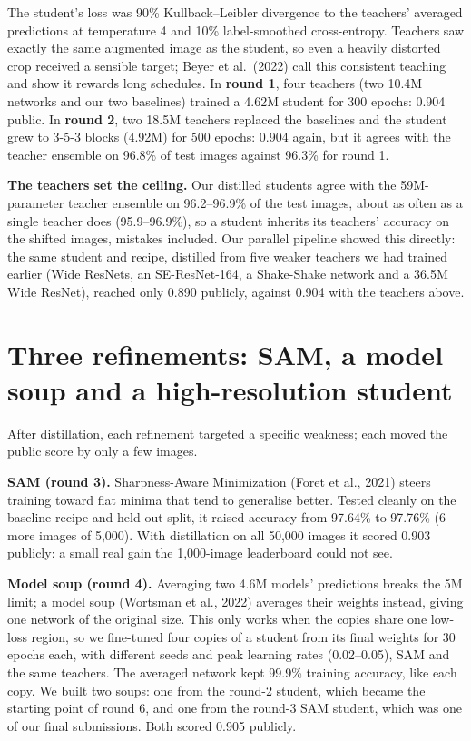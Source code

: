 \documentclass[11pt]{article}
\begin{document}
The student's loss was 90\% Kullback--Leibler divergence to the teachers' averaged predictions at temperature 4 and 10\% label-smoothed cross-entropy. Teachers saw exactly the same augmented image as the student, so even a heavily distorted crop received a sensible target; Beyer et al.\ (2022) call this consistent teaching and show it rewards long schedules. In \textbf{round 1}, four teachers (two 10.4M networks and our two baselines) trained a 4.62M student for 300 epochs: 0.904 public. In \textbf{round 2}, two 18.5M teachers replaced the baselines and the student grew to 3-5-3 blocks (4.92M) for 500 epochs: 0.904 again, but it agrees with the teacher ensemble on 96.8\% of test images against 96.3\% for round 1.

\textbf{The teachers set the ceiling.} Our distilled students agree with the 59M-parameter teacher ensemble on 96.2--96.9\% of the test images, about as often as a single teacher does (95.9--96.9\%), so a student inherits its teachers' accuracy on the shifted images, mistakes included. Our parallel pipeline showed this directly: the same student and recipe, distilled from five weaker teachers we had trained earlier (Wide ResNets, an SE-ResNet-164, a Shake-Shake network and a 36.5M Wide ResNet), reached only 0.890 publicly, against 0.904 with the teachers above.

\section{Three refinements: SAM, a model soup and a high-resolution student}
After distillation, each refinement targeted a specific weakness; each moved the public score by only a few images.

\textbf{SAM (round 3).} Sharpness-Aware Minimization (Foret et al., 2021) steers training toward flat minima that tend to generalise better. Tested cleanly on the baseline recipe and held-out split, it raised accuracy from 97.64\% to 97.76\% (6 more images of 5,000). With distillation on all 50,000 images it scored 0.903 publicly: a small real gain the 1,000-image leaderboard could not see.

\textbf{Model soup (round 4).} Averaging two 4.6M models' predictions breaks the 5M limit; a model soup (Wortsman et al., 2022) averages their weights instead, giving one network of the original size. This only works when the copies share one low-loss region, so we fine-tuned four copies of a student from its final weights for 30 epochs each, with different seeds and peak learning rates (0.02--0.05), SAM and the same teachers. The averaged network kept 99.9\% training accuracy, like each copy. We built two soups: one from the round-2 student, which became the starting point of round 6, and one from the round-3 SAM student, which was one of our final submissions. Both scored 0.905 publicly.
\end{document}
